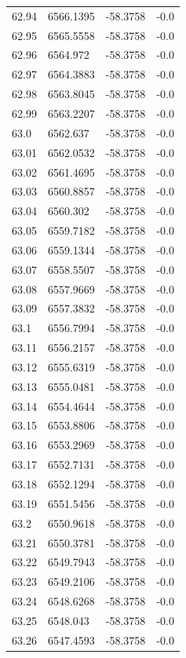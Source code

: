 \begin{table}[H]
\begin{tabular}{llll}
62.94 & 6566.1395 & -58.3758 & -0.0 \\
62.95 & 6565.5558 & -58.3758 & -0.0 \\
62.96 & 6564.972 & -58.3758 & -0.0 \\
62.97 & 6564.3883 & -58.3758 & -0.0 \\
62.98 & 6563.8045 & -58.3758 & -0.0 \\
62.99 & 6563.2207 & -58.3758 & -0.0 \\
63.0 & 6562.637 & -58.3758 & -0.0 \\
63.01 & 6562.0532 & -58.3758 & -0.0 \\
63.02 & 6561.4695 & -58.3758 & -0.0 \\
63.03 & 6560.8857 & -58.3758 & -0.0 \\
63.04 & 6560.302 & -58.3758 & -0.0 \\
63.05 & 6559.7182 & -58.3758 & -0.0 \\
63.06 & 6559.1344 & -58.3758 & -0.0 \\
63.07 & 6558.5507 & -58.3758 & -0.0 \\
63.08 & 6557.9669 & -58.3758 & -0.0 \\
63.09 & 6557.3832 & -58.3758 & -0.0 \\
63.1 & 6556.7994 & -58.3758 & -0.0 \\
63.11 & 6556.2157 & -58.3758 & -0.0 \\
63.12 & 6555.6319 & -58.3758 & -0.0 \\
63.13 & 6555.0481 & -58.3758 & -0.0 \\
63.14 & 6554.4644 & -58.3758 & -0.0 \\
63.15 & 6553.8806 & -58.3758 & -0.0 \\
63.16 & 6553.2969 & -58.3758 & -0.0 \\
63.17 & 6552.7131 & -58.3758 & -0.0 \\
63.18 & 6552.1294 & -58.3758 & -0.0 \\
63.19 & 6551.5456 & -58.3758 & -0.0 \\
63.2 & 6550.9618 & -58.3758 & -0.0 \\
63.21 & 6550.3781 & -58.3758 & -0.0 \\
63.22 & 6549.7943 & -58.3758 & -0.0 \\
63.23 & 6549.2106 & -58.3758 & -0.0 \\
63.24 & 6548.6268 & -58.3758 & -0.0 \\
63.25 & 6548.043 & -58.3758 & -0.0 \\
63.26 & 6547.4593 & -58.3758 & -0.0 \\

\end{tabular}
\end{table}
